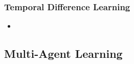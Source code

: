 \subsubsection{Temporal Difference Learning}
\begin{itemize}
\item 
\end{itemize}

\subsection{Multi-Agent Learning}

